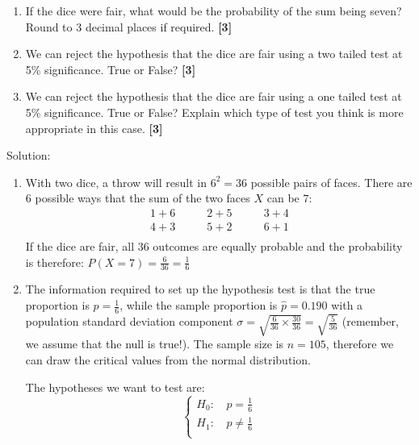 \documentclass[a4paper, leqno, 12pt]{article} %
\newenvironment{top_enumerate}{
\begin{enumerate}
  \setlength{\itemsep}{2em}
  \setlength{\topsep}{-0pt}
  \setlength{\partopsep}{-0pt}
}{\end{enumerate}}
\begin{document}
\begin{top_enumerate}
\setcounter{equation}{0}  %
\begin{enumerate}
	\setlength{\topsep}{-0pt}
	\setlength{\partopsep}{-0pt}
	\setlength{\itemsep}{10pt}
			\item If the dice were fair, what would be the probability of the sum being seven? Round to 3 decimal places if required.
	 \quad \textbf{[3]}
		\item We can reject the hypothesis that the dice are fair using a two tailed test at 5\% significance. True or False?
	 \quad \textbf{[3]}
		\item We can reject the hypothesis that the dice are fair using a one tailed test at 5\% significance. True or False? Explain which type of test you think is more appropriate in this case.
	 \quad \textbf{[3]}
\end{enumerate}\addtocounter{enumi}{-1}
\item Solution:
 
\setcounter{equation}{0}  %
\begin{enumerate}
	\setlength{\topsep}{-0pt}
	\setlength{\partopsep}{-0pt}
	\setlength{\itemsep}{10pt}
			\item With two dice, a throw will result in $6^2=36$ possible pairs of faces. There are $6$ possible ways that the sum of the two faces $X$ can be $7$:
	\[
	\begin{aligned}
	1 + 6 \quad & \quad 2 + 5 \quad & \quad 3 + 4\\
	4 + 3 \quad & \quad 5 + 2 \quad & \quad 6 + 1\\
	\end{aligned}
	\]
	If the dice are fair, all 36 outcomes are equally probable and the probability is therefore:
	$P\left(X = 7 \right) = \frac{6}{36} = \frac{1}{6}$
	 \quad \textbf{}
		\item The information required to set up the hypothesis test is that the true proportion is $p = \frac{1}{6}$, while the sample proportion is $\hat p = {0.190}$ with a population standard deviation component $\sigma = \sqrt{\frac{6}{36} \times \frac{30}{36}} = \sqrt{\frac{5}{36}}$ (remember, we assume that the null is true!). The sample size is $n={105}$, therefore we can draw the critical values from the normal distribution.
	
	The hypotheses we want to test are:
	\[
	\left\{\begin{aligned}
	H_0: \, & p = \frac{1}{6} \\
	H_1: \, & p \ne \frac{1}{6} \\
	\end{aligned}\right.
	\]
	

\end{enumerate}
\end{top_enumerate}
\end{document}

